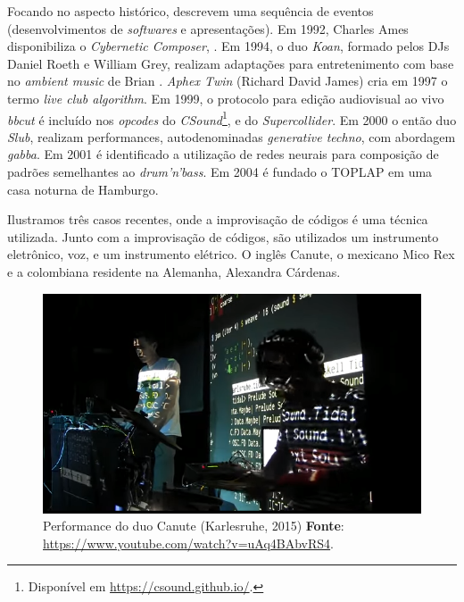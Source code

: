 Focando no aspecto histórico,  descrevem uma sequência de eventos (desenvolvimentos de \emph{softwares} e apresentações). Em 1992, Charles Ames disponibiliza o \emph{Cybernetic Composer}, . Em 1994, o duo \emph{Koan}, formado pelos DJs Daniel Roeth e William Grey, realizam adaptações para entretenimento com base no \emph{ambient music} de Brian . \emph{Aphex Twin} (Richard David James) cria em 1997 o termo \emph{live club algorithm}. Em 1999, o protocolo para edição audiovisual ao vivo \emph{bbcut} \cite{collins_bbcut_2003} é incluído nos \emph{opcodes} do \emph{CSound}\footnote{Disponível em \url{https://csound.github.io/}.}, e do \emph{Supercollider}. Em 2000 o então duo \emph{Slub}, realizam performances, autodenominadas \emph{generative techno}, com abordagem \emph{gabba}. Em 2001 é identificado a utilização de redes neurais para composição de padrões semelhantes ao \emph{drum'n'bass}. Em 2004 é fundado o TOPLAP em uma casa noturna de Hamburgo.

Ilustramos três casos recentes, onde a improvisação de códigos é uma técnica utilizada. Junto com a improvisação de códigos, são utilizados um instrumento eletrônico, voz, e um instrumento elétrico. O inglês Canute, o mexicano Mico Rex e a colombiana residente na Alemanha, Alexandra Cárdenas.

\begin{figure}[!h]
  \centering
  \includegraphics[scale=0.71]{imagens/canute.png}
  \caption{Performance do duo Canute (Karlesruhe, 2015) \textbf{Fonte}: \url{https://www.youtube.com/watch?v=uAq4BAbvRS4}.}
  \label{fig:canute}
\end{figure}


